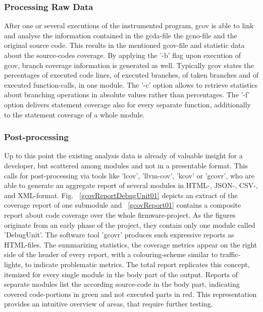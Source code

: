 \documentclass[master,english,smartquotes,apa]{hgbthesis}
\begin{document}
			\subsubsection{Processing Raw Data}
				After one or several executions of the instrumented program, gcov is able to link and analyse the information contained in the gcda-file the gcno-file and the original source code. This results in the mentioned gcov-file and statistic data about the source-codes coverage. By applying the '-b' flag upon execution of gcov, branch coverage information is generated as well. Typically gcov states the percentages of executed code lines, of executed branches, of taken branches and of executed function-calls, in one module. The '-c' option allows to retrieve statistics about branching operations in absolute values rather than percentages. The '-f' option delivers statement coverage also for every separate function, additionally to the statement coverage of a whole module.
			\subsubsection{Post-processing}
				Up to this point the existing analysis data is already of valuable insight for a developer, but scattered among modules and not in a presentable format. This calls for post-processing via tools like 'lcov', 'llvm-cov', 'kcov' or 'gcovr', who are able to generate an aggregate report of several modules in HTML-, JSON-, CSV-, and XML-format. \cite{lcov} \cite{kcov}
				Fig. ~\ref{gcovReportDebugUnit01} depicts an extract of the coverage report of one submodule and ~\ref{gcovReport01} contains a composite report about code coverage over the whole firmware-project. As the figures originate from an early phase of the project, they contain only one module called 'DebugUnit'. The software tool 'gcovr' produces such expressive reports as HTML-files. The summarizing statistics, the coverage metrics appear on the right side of the header of every report, with a colouring-scheme similar to traffic-lights, to indicate problematic metrics. The total report replicates this concept, itemized for every single module in the body part of the output. Reports of separate modules list the according source-code in the body part, indicating covered code-portions in green and not executed parts in red. This representation provides an intuitive overview of areas, that require further testing.
			
\end{document}
